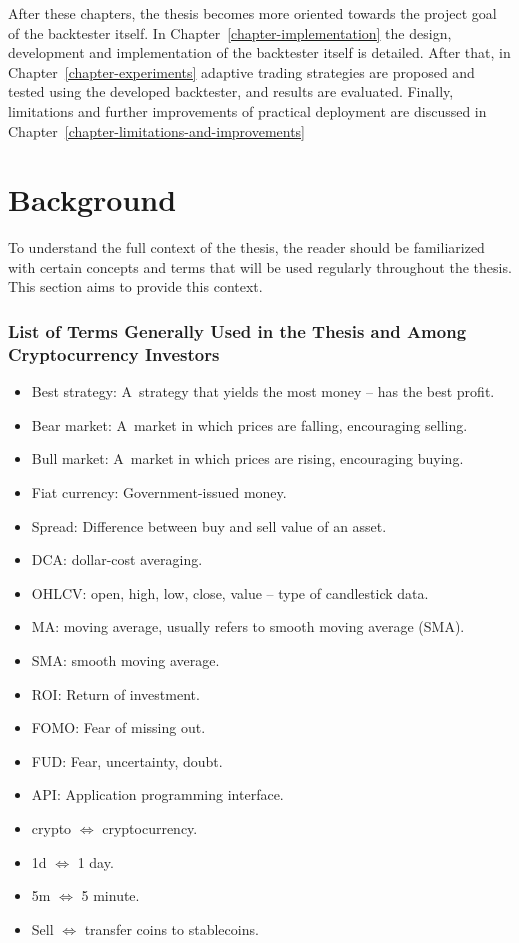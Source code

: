 After these chapters, the thesis becomes more oriented towards the project goal of the backtester itself. In Chapter~\ref{chapter-implementation} the design, development and implementation of the backtester itself is detailed. After that, in Chapter~\ref{chapter-experiments} adaptive trading strategies are proposed and tested using the developed backtester, and results are evaluated. Finally, limitations and further improvements of practical deployment are discussed in Chapter~\ref{chapter-limitations-and-improvements}

\chapter{Background}
\label{chapter-background}

To understand the full context of the thesis, the reader should be familiarized with certain concepts and terms that will be used regularly throughout the thesis. This section aims to provide this context.

\subsection*{List of Terms Generally Used in the Thesis and Among Cryptocurrency Investors}
\begin{itemize}
    \item Best strategy: A~strategy that yields the most money -- has the best profit.
    \item Bear market: A~market in which prices are falling, encouraging selling.
    \item Bull market: A~market in which prices are rising, encouraging buying.
    \item Fiat currency: Government-issued money.
    \item Spread: Difference between buy and sell value of an asset.
    \item DCA: dollar-cost averaging.
    \item OHLCV: open, high, low, close, value -- type of candlestick data.
    \item MA: moving average, usually refers to smooth moving average (SMA).
    \item SMA: smooth moving average.
    \item ROI: Return of investment.
    \item FOMO: Fear of missing out.
    \item FUD: Fear, uncertainty, doubt.
    \item API: Application programming interface.
    \item crypto $\Leftrightarrow$ cryptocurrency.
    \item 1d $\Leftrightarrow$ 1 day.
    \item 5m $\Leftrightarrow$ 5 minute.
    \item Sell $\Leftrightarrow$ transfer coins to stablecoins.
\end{itemize}

